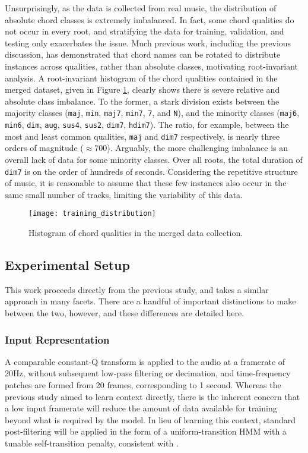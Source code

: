Unsurprisingly, as the data is collected from real music, the distribution of absolute chord classes is extremely imbalanced.
In fact, some chord qualities do not occur in every root, and stratifying the data for training, validation, and testing only exacerbates the issue.
Much previous work, including the previous discussion, has demonstrated that chord names can be rotated to distribute instances across qualities, rather than absolute classes, motivating root-invariant analysis.
A root-invariant histogram of the chord qualities contained in the merged dataset, given in Figure \ref{fig:training_distribution}, clearly shows there is severe relative and absolute class imbalance.
To the former, a stark division exists between the majority classes (\texttt{maj}, \texttt{min}, \texttt{maj7}, \texttt{min7}, \texttt{7}, and \texttt{N}), and the minority classes (\texttt{maj6}, \texttt{min6}, \texttt{dim}, \texttt{aug}, \texttt{sus4}, \texttt{sus2}, \texttt{dim7}, \texttt{hdim7}).
The ratio, for example, between the most and least common qualities, \texttt{maj} and \texttt{dim7} respectively, is nearly three orders of magnitude ($\approx 700$).
Arguably, the more challenging imbalance is an overall lack of data for some minority classes.
Over all roots, the total duration of \texttt{dim7} is on the order of hundreds of seconds.
Considering the repetitive structure of music, it is reasonable to assume that these few instances also occur in the same small number of tracks, limiting the variability of this data.

\begin{figure}[!t]
\centering
\texttt{[image: training\_distribution]}
\caption{Histogram of chord qualities in the merged data collection.}
\label{fig:training_distribution}
\end{figure}


\subsection{Experimental Setup}
\label{subsec:experimental_setup}
This work proceeds directly from the previous study, and takes a similar approach in many facets.
There are a handful of important distinctions to make between the two, however, and these differences are detailed here.

\subsubsection{Input Representation}
\label{subsubsec:data_considerations}
A comparable constant-Q transform is applied to the audio at a framerate of 20Hz, without subsequent low-pass filtering or decimation, and time-frequency patches are formed from 20 frames, corresponding to 1 second.
Whereas the previous study aimed to learn context directly, there is the inherent concern that a low input framerate will reduce the amount of data available for training beyond what is required by the model.
In lieu of learning this context, standard post-filtering will be applied in the form of a uniform-transition HMM with a tunable self-transition penalty, consistent with \cite{Cho2014Improved}. %

